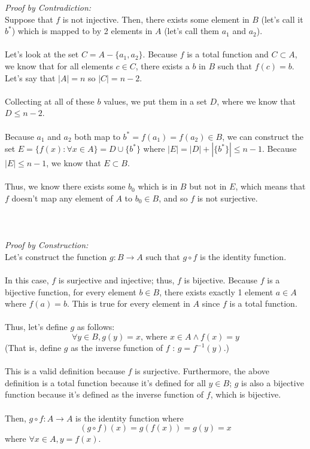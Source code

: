 \documentclass[solution, letterpaper]{cs20}
\begin{document}
\begin{solution}
\subsolution
\textit{Proof by Contradiction:}\\
Suppose that $f$ is not injective. Then, there exists some element in $B$ (let's call it $b^*$) which is mapped to by 2 elements in $A$ (let's call them $a_1$ and $a_2$). \\ \\
\noindent Let's look at the set $C = A - \{a_1, a_2\}$. Because $f$ is a total function and $C \subset A$, we know that for all elements $c \in C$, there exists a $b$ in $B$ such that $f(c) = b$. Let's say that $|A| = n$ so $|C| = n - 2$. \\ \\
\noindent Collecting at all of these $b$ values, we put them in a set $D$, where we know that $D \leq n - 2$. \\ \\
\noindent Because $a_1$ and $a_2$ both map to $b^* = f(a_1) = f(a_2) \in B$, we can construct the set $E = \{f(x) : \forall x \in A\} = D \cup \{b^*\}$ where $|E| = |D| + |\{b^*\}| \leq n - 1$. Because $|E| \leq n-1$, we know that $E \subset B$.  \\ \\
\noindent Thus, we know there exists some $b_0$ which is in $B$ but not in $E$, which means that $f$ doesn't map any element of $A$ to $b_0 \in B$, and so $f$ is not surjective. \\ \\ \\ \\

\subsolution
\textit{Proof by Construction:}\\
Let's construct the function $g: B \to A$ such that $g \circ f$ is the identity function. \\ \\
\noindent In this case, $f$ is surjective and injective; thus, $f$ is bijective. Because $f$ is a bijective function, for every element $b \in B$, there exists exactly 1 element $a \in A$ where $f(a) = b$. This is true for every element in $A$ since $f$ is a total function. \\ \\
\noindent Thus, let's define $g$ as follows:
$$\forall y \in B, g(y) = x\text{, where }x \in A \wedge f(x) = y$$
(That is, define $g$ as the inverse function of $f$ : $g = f^{-1}(y)$.)\\\\
This is a valid definition because $f$ is surjective. Furthermore, the above definition is a total function because it's defined for all $y \in B$; $g$ is also a bijective function because it's defined as the inverse function of $f$, which is bijective.\\\\
Then, $g \circ f: A \to A$ is the identity function where
$$(g \circ f)(x) = g(f(x)) = g(y) = x$$
where $\forall x \in A, y = f(x)$.

\end{solution}
\end{document}
